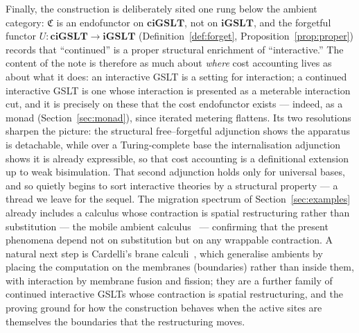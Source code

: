 \documentclass[11pt]{article}
\theoremstyle{definition}
\theoremstyle{plain}
\newcommand{\iGSLT}{\mathbf{iGSLT}}
\newcommand{\ciGSLT}{\mathbf{ciGSLT}}
\newcommand{\Cost}{\mathfrak{C}}              %
\begin{document}
Finally, the construction is deliberately sited one rung below the
ambient category: $\Cost$ is an endofunctor on $\ciGSLT$, not on
$\iGSLT$, and the forgetful functor $U : \ciGSLT \to \iGSLT$
(Definition~\ref{def:forget}, Proposition~\ref{prop:proper}) records that
``continued'' is a proper structural enrichment of ``interactive.'' The
content of the note is therefore as much about \emph{where} cost
accounting lives as about what it does: an interactive GSLT is a setting
for interaction; a continued interactive GSLT is one whose interaction is
presented as a meterable interaction cut, and it is precisely on these that the cost
endofunctor exists --- indeed, as a monad
(Section~\ref{sec:monad}), since iterated metering flattens. Its two
resolutions sharpen the picture: the structural free--forgetful
adjunction shows the apparatus is detachable, while over a Turing-complete
base the internalisation adjunction shows it is already expressible, so
that cost accounting is a definitional extension up to weak bisimulation.
That second adjunction holds only for universal bases, and so quietly
begins to sort interactive theories by a structural property --- a thread
we leave for the sequel. The migration spectrum of
Section~\ref{sec:examples} already includes a calculus whose contraction
is spatial restructuring rather than substitution --- the mobile ambient
calculus~\cite{CardelliGordon2000} --- confirming that the present
phenomena depend not on substitution but on any wrappable contraction. A
natural next step is Cardelli's brane calculi~\cite{Cardelli2004}, which
generalise ambients by placing the computation on the membranes
(boundaries) rather than inside them, with interaction by membrane fusion
and fission; they are a further family of continued interactive GSLTs
whose contraction is spatial restructuring, and the proving ground for how
the construction behaves when the active sites are themselves the
boundaries that the restructuring moves.
\end{document}
